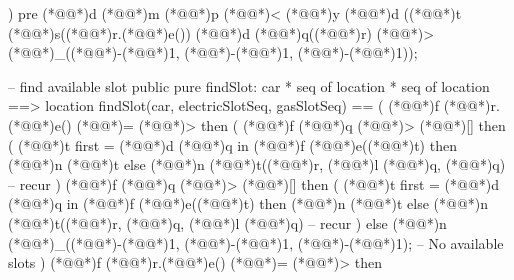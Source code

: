 \documentclass[a4paper]{article}
\begin{document}
\begin{vdm_al}
    
)
pre (*@@*)d (*@@*)m (*@@*)p (*@\vdmnotcovered{}@*)< (*@@*)y (*@@*)d ((*@@*)t (*@@*)s((*@@*)r.(*@@*)e()) (*@@*)d (*@@*)q((*@@*)r) (*@\vdmnotcovered{<}@*)> (*@@*)_((*@\vdmnotcovered{}@*)-(*@\vdmnotcovered{}@*)1, (*@\vdmnotcovered{}@*)-(*@\vdmnotcovered{}@*)1, (*@\vdmnotcovered{}@*)-(*@\vdmnotcovered{}@*)1));



-- find available slot
public pure findSlot: car * seq of location * seq of location ==> location
findSlot(car, electricSlotSeq, gasSlotSeq) ==
(
    (*@@*)f (*@@*)r.(*@@*)e() (*@\vdmnotcovered{}@*)= (*@@*)> then
    (
        (*@@*)f (*@@*)q (*@\vdmnotcovered{<}@*)> (*@\vdmnotcovered{}@*)[] then
        (
            (*@@*)t first = (*@@*)d (*@@*)q in
            (*@@*)f (*@@*)e((*@@*)t) then
                (*@@*)n (*@@*)t
            else
                (*@@*)n (*@@*)t((*@@*)r, (*@@*)l (*@@*)q, (*@@*)q)  -- recur
        )
        (*@@*)f (*@@*)q (*@\vdmnotcovered{<}@*)> (*@\vdmnotcovered{}@*)[] then
        (
            (*@@*)t first = (*@@*)d (*@@*)q in
            (*@@*)f (*@@*)e((*@@*)t) then
                (*@@*)n (*@@*)t
            else
                (*@@*)n (*@@*)t((*@@*)r, (*@@*)q, (*@@*)l (*@@*)q)  -- recur
        )
        else
            (*@@*)n (*@@*)_((*@\vdmnotcovered{}@*)-(*@\vdmnotcovered{}@*)1, (*@\vdmnotcovered{}@*)-(*@\vdmnotcovered{}@*)1, (*@\vdmnotcovered{}@*)-(*@\vdmnotcovered{}@*)1);  -- No available slots
    )
    (*@@*)f (*@@*)r.(*@@*)e() (*@\vdmnotcovered{}@*)= (*@@*)> then

\end{vdm_al}
\end{document}
